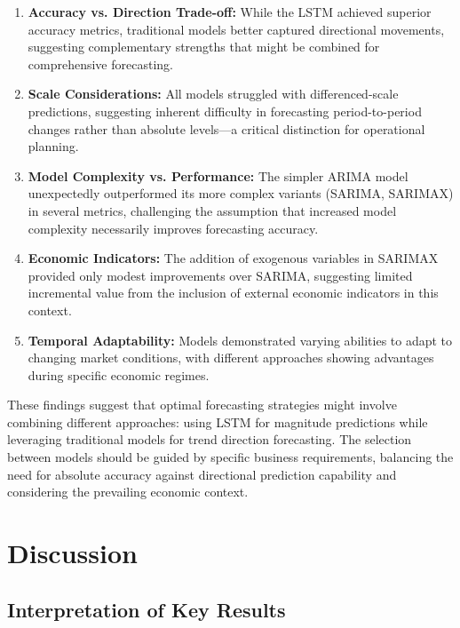 \documentclass[12pt,a4paper]{report}
\begin{document}
\begin{enumerate}
    \item \textbf{Accuracy vs. Direction Trade-off:} While the LSTM achieved superior accuracy metrics, traditional models better captured directional movements, suggesting complementary strengths that might be combined for comprehensive forecasting.
    
    \item \textbf{Scale Considerations:} All models struggled with differenced-scale predictions, suggesting inherent difficulty in forecasting period-to-period changes rather than absolute levels—a critical distinction for operational planning.
    
    \item \textbf{Model Complexity vs. Performance:} The simpler ARIMA model unexpectedly outperformed its more complex variants (SARIMA, SARIMAX) in several metrics, challenging the assumption that increased model complexity necessarily improves forecasting accuracy.
    
    \item \textbf{Economic Indicators:} The addition of exogenous variables in SARIMAX provided only modest improvements over SARIMA, suggesting limited incremental value from the inclusion of external economic indicators in this context.
    
    \item \textbf{Temporal Adaptability:} Models demonstrated varying abilities to adapt to changing market conditions, with different approaches showing advantages during specific economic regimes.
\end{enumerate}

These findings suggest that optimal forecasting strategies might involve combining different approaches: using LSTM for magnitude predictions while leveraging traditional models for trend direction forecasting. The selection between models should be guided by specific business requirements, balancing the need for absolute accuracy against directional prediction capability and considering the prevailing economic context.

\chapter{Discussion}
\section{Interpretation of Key Results}
\end{document}
